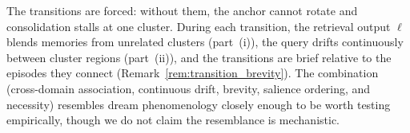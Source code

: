 \begin{remark}
\label{rem:dream_states}
\leanok
{}
The transitions are forced: without them, the anchor cannot rotate and consolidation stalls at one cluster.  During each transition, the retrieval output $\ell$ blends memories from unrelated clusters (part~(i)), the query drifts continuously between cluster regions (part~(ii)), and the transitions are brief relative to the episodes they connect (Remark~\ref{rem:transition_brevity}).  The combination (cross-domain association, continuous drift, brevity, salience ordering, and necessity) resembles dream phenomenology closely enough to be worth testing empirically, though we do not claim the resemblance is mechanistic.
\end{remark}

